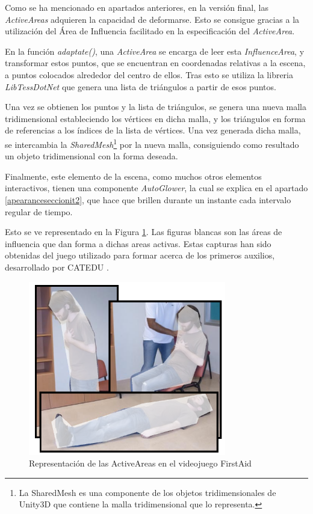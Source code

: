 Como se ha mencionado en apartados anteriores, en la versión final, las \textit{ActiveAreas} adquieren la capacidad de deformarse. Esto se consigue gracias a la utilización del Área de Influencia facilitado en la especificación del \textit{ActiveArea}.

En la función \textit{adaptate()}, una \textit{ActiveArea} se encarga de leer esta \textit{InfluenceArea}, y transformar estos puntos, que se encuentran en coordenadas relativas a la escena, a puntos colocados alrededor del centro de ellos. Tras esto se utiliza la libreria \textit{LibTessDotNet} que genera una lista de triángulos a partir de esos puntos.

Una vez se obtienen los puntos y la lista de triángulos, se genera una nueva malla tridimensional estableciendo los vértices en dicha malla, y los triángulos en forma de referencias a los índices de la lista de vértices. Una vez generada dicha malla, se intercambia la \textit{SharedMesh}\footnote{La SharedMesh es una componente de los objetos tridimensionales de Unity3D que contiene la malla tridimensional que lo representa.} por la nueva malla, consiguiendo como resultado un objeto tridimensional con la forma deseada.

Finalmente, este elemento de la escena, como muchos otros elementos interactivos, tienen una componente \textit{AutoGlower}, la cual se explica en el apartado \ref{apearanceseccionit2}, que hace que brillen durante un instante cada intervalo regular de tiempo.

Esto se ve representado en la Figura \ref{activeareasit2}. Las figuras blancas son las áreas de influencia que dan forma a dichas areas activas. Estas capturas han sido obtenidas del juego utilizado para formar acerca de los primeros auxilios, desarrollado por CATEDU \cite{catedu}.

\begin{figure}[h!]
	\centerline{\includegraphics[height=3in]{figures/it2/Apearance/ActiveAreas.png}}
	\caption[ActiveAreas - Versión Final]{Representación de las ActiveAreas en el videojuego FirstAid}
	\label{activeareasit2}
\end{figure}

